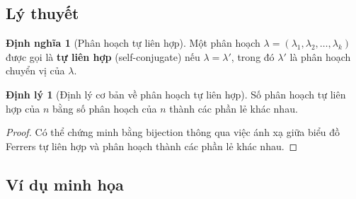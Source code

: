 \documentclass[12pt,a4paper]{article}
\theoremstyle{definition}
\newtheorem{definition}{Định nghĩa}
\newtheorem{theorem}{Định lý}
\begin{document}
\subsection{Lý thuyết}

\begin{definition}[Phân hoạch tự liên hợp]
Một phân hoạch $\lambda = (\lambda_1, \lambda_2, \ldots, \lambda_k)$ được gọi là \textbf{tự liên hợp} (self-conjugate) nếu $\lambda = \lambda'$, trong đó $\lambda'$ là phân hoạch chuyển vị của $\lambda$.
\end{definition}

\begin{theorem}[Định lý cơ bản về phân hoạch tự liên hợp]
Số phân hoạch tự liên hợp của $n$ bằng số phân hoạch của $n$ thành các phần lẻ khác nhau.
\end{theorem}

\begin{proof}
Có thể chứng minh bằng bijection thông qua việc ánh xạ giữa biểu đồ Ferrers tự liên hợp và phân hoạch thành các phần lẻ khác nhau.
\end{proof}

\subsection{Ví dụ minh họa}
\end{document}
